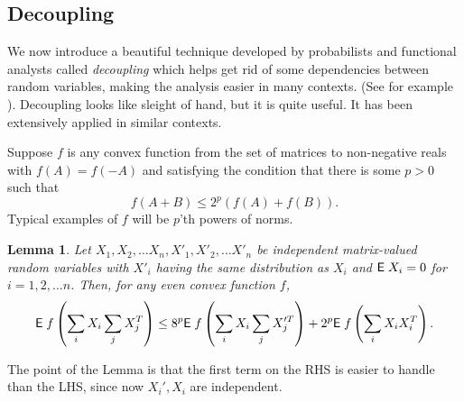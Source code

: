 \documentclass{book}
\newtheorem{lemma}[theorem]{Lemma}
\numberwithin{exercise}{chapter}
\begin{document}
{\subsection{Decoupling}

We now introduce a beautiful technique developed by probabilists and functional analysts called
{\em decoupling} which helps
get rid of some dependencies between random variables, making the analysis easier in many contexts.
(See for example \cite{La Pena and Gine??}).
Decoupling looks like sleight of hand, but it is quite useful. It
has been extensively applied in similar contexts.

Suppose $f$ is any convex function from the set of matrices to non-negative reals with
$f(A)=f(-A)$ and satisfying the
condition that there is some $p>0$ such that
$$f(A+B)\leq 2^p (f(A)+f(B)).$$
Typical examples of $f$ will be $p$'th powers of norms.

\begin{lemma}\label{decoupling}
Let $X_1,X_2,\ldots X_n, X'_1,X'_2,\ldots X'_n$ be independent matrix-valued random variables with $X'_i$
having the same distribution as $X_i$ and $\hbox{{\sf E}\;} X_i=0$ for $i=1,2,\ldots n$. Then, for any even convex function $f$,
$$\hbox{{\sf E}\;} f\left(\sum_iX_i\sum_jX_j^T\right)\leq 8^p \hbox{{\sf E}\;} f\left(\sum_i X_i\sum_jX^{\prime T}_j\right)+2^p\hbox{{\sf E}\;} f\left( \sum_iX_iX_i^T\right).$$
\end{lemma}

The point of the Lemma is that the first term on
the RHS is easier to handle than the LHS, since now
$X_i',X_i$ are independent.

}
\end{document}
